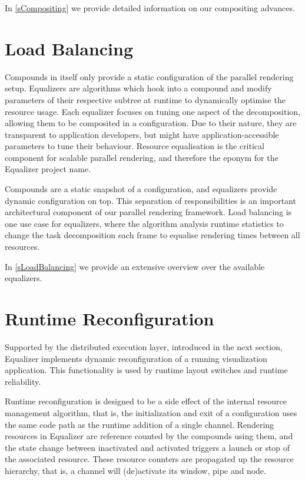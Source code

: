 In \cref{sCompositing} we provide detailed information on our compositing advances.

\section{Load Balancing}

Compounds in itself only provide a static configuration of the parallel
rendering setup. \textsf{Equalizers} are algorithms which hook into a compound
and modify parameters of their respective subtree at runtime to dynamically
optimise the resource usage. Each equalizer focuses on tuning one aspect of
the decomposition, allowing them to be composited in a configuration. Due to
their nature, they are transparent to application developers, but might have
application-accessible parameters to tune their behaviour. Resource equalisation
is the critical component for scalable parallel rendering, and therefore the
eponym for the \textsf{Equalizer} project name.

Compounds are a static snapshot of a configuration, and equalizers provide
dynamic configuration on top. This separation of responsibilities is an
important architectural component of our parallel rendering framework. Load
balancing is one use case for equalizers, where the algorithm analysis runtime
statistics to change the task decomposition each frame to equalise rendering
times between all resources.

In \cref{sLoadBalancing} we provide an extensive overview over the available
equalizers.

\section{Runtime Reconfiguration}

Supported by the distributed execution layer, introduced in the next section,
Equalizer implements dynamic reconfiguration of a running visualization
application. This functionality is used by runtime layout switches and runtime
reliability.

Runtime reconfiguration is designed to be a side effect of the internal resource
management algorithm, that is, the initialization and exit of a configuration
uses the same code path as the runtime addition of a single channel. Rendering
resources in Equalizer are reference counted by the compounds using them, and the
state change between inactivated and activated triggers a launch or stop of the
associated resource. These resource counters are propagated up the resource
hierarchy, that is, a channel will (de)activate its window, pipe and node.

